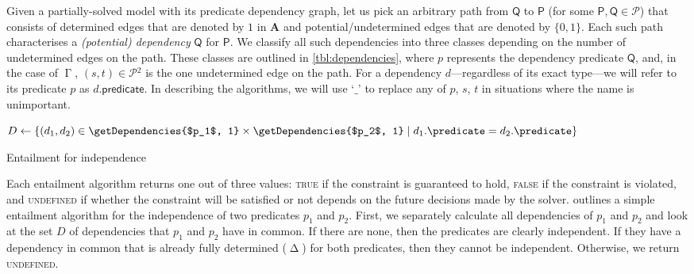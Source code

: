 \documentclass[runningheads]{llncs}
\newcommand{\predicates}{\mathcal{P}}
\DeclareMathOperator{\Determined}{\Delta}
\DeclareMathOperator{\AlmostDetermined}{\Gamma}
\begin{document}
Given a partially-solved model with its predicate dependency graph, let us pick
an arbitrary path from $\mathsf{Q}$ to $\mathsf{P}$ (for some $\mathsf{P},
\mathsf{Q} \in \predicates{}$) that consists of determined edges that are
denoted by $1$ in $\mathbf{A}$ and potential/undetermined edges that are
denoted by $\{ 0, 1 \}$. Each such path characterises a \emph{(potential)
  dependency} $\mathsf{Q}$ for $\mathsf{P}$. We classify all such dependencies
into three classes depending on the number of undetermined edges on the path.
These classes are outlined in \cref{tbl:dependencies}, where $p$ represents the
dependency predicate $\mathsf{Q}$, and, in the case of $\AlmostDetermined{}$,
$(s, t) \in \predicates{}^2$ is the one undetermined edge on the path. For a
dependency $d$---regardless of its exact type---we will refer to its predicate
$p$ as $d.\mathsf{predicate}$. In describing the algorithms, we will use `$\_$'
to replace any of $p$, $s$, $t$ in situations where the name is unimportant.

\begin{algorithm}[t]
  $D \gets \{ (d_1, d_2) \in \getDependencies{$p_1$, 1} \times
  \getDependencies{$p_2$, 1} \mid d_1.\predicate = d_2.\predicate \}$\;
  \leIf{$\exists (\Determined \_, \Determined \_) \in
    D$}{\Return{\textsc{false}}}{\Return{\textsc{undefined}}}
  \caption{Entailment for independence}
  \label{alg:independence_entailment}
\end{algorithm}

Each entailment algorithm returns one out of three values:
\textsc{true} if the constraint is guaranteed to hold, \textsc{false} if the
constraint is violated, and \textsc{undefined} if whether the constraint will be
satisfied or not depends on the future decisions made by the solver.
 outlines a simple entailment algorithm for
the independence of two predicates $p_1$ and $p_2$. First, we separately
calculate all dependencies of $p_1$ and $p_2$ and look at the set $D$ of
dependencies that $p_1$ and $p_2$ have in common. If there are none, then the
predicates are clearly independent. If they have a dependency in common that is
already fully determined ($\Determined$) for both predicates, then they cannot be
independent. Otherwise, we return \textsc{undefined}.
\end{document}
